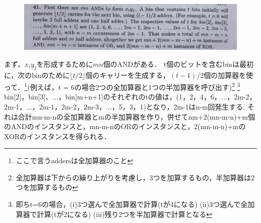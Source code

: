\documentclass[dvipdfmx,a4paper,12pt]{jsarticle}
\begin{document}
\begin{figure}[htbp]
  \centering
  \includegraphics[width=130mm]{images/e2.jpg}
\end{figure}

まず、$x_{i}y_{j}$を形成するために$mn$個のANDがある．
t個のビットを含むbinは最初に，次のbinのために$\lfloor t/2 \rfloor $個のキャリーを生成する，$(t-1)/2$個の加算器を使って．\footnote{ここで言うaddersは全加算器のこと}(例えば，t = 6の場合2つの全加算器と1つの半加算器を呼び出す)\footnote{全加算器は下からの繰り上がりを考慮し，3つを加算するもの，半加算器は2つを加算するもの} \footnote{即ちt=6の場合，(i)3つ選んで全加算器で計算(tが4になる) (ii)3つ選んで全加算器で計算(tが2になる) (iii)残り2つを半加算器で計算となる}
bin[2]，bin[3]、...，bin[m+n+1]のそれぞれのtの値は，(1，2，4，6，...，2m-2，2m-1，...，2m-1，2m-2，2m-3，...，5，3，1)となり，2m-1はn-m回発生する.
 それは合計mn-m-nの全加算器とmの半加算器を作り，併せてmn+2(mn-m-n)+m個のANDのインスタンスと，mn-m-nのORのインスタンスと，2(mn-m-n)+mのXORのインスタンスを得られる．
\newpage
\end{document}
